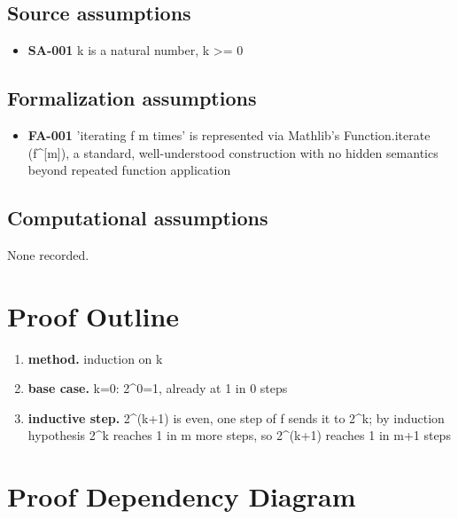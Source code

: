 \documentclass[11pt]{article}
\begin{document}
\subsection*{Source assumptions}
\begin{itemize}
\item \textbf{SA-001} k is a natural number, k >= 0
\end{itemize}
\subsection*{Formalization assumptions}
\begin{itemize}
\item \textbf{FA-001} 'iterating f m times' is represented via Mathlib's Function.iterate (f\textasciicircum{}[m]), a standard, well-understood construction with no hidden semantics beyond repeated function application
\end{itemize}
\subsection*{Computational assumptions}
None recorded.
\section{Proof Outline}
\begin{enumerate}
\item \textbf{method.} induction on k
\item \textbf{base case.} k=0: 2\textasciicircum{}0=1, already at 1 in 0 steps
\item \textbf{inductive step.} 2\textasciicircum{}(k+1) is even, one step of f sends it to 2\textasciicircum{}k; by induction hypothesis 2\textasciicircum{}k reaches 1 in m more steps, so 2\textasciicircum{}(k+1) reaches 1 in m+1 steps
\end{enumerate}
\section{Proof Dependency Diagram}
\begin{center}
\end{center}
\end{document}
